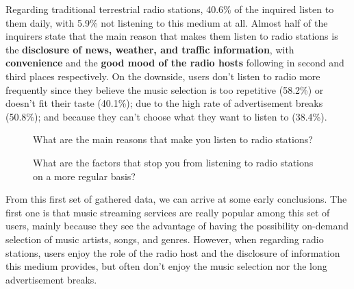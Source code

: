 Regarding traditional terrestrial radio stations, 40.6\% of the inquired listen to them daily, with 5.9\% not listening to this medium at all. Almost half of the inquirers state that the main reason that makes them listen to radio stations is the \textbf{disclosure of news, weather, and traffic information}, with \textbf{convenience} and the \textbf{good mood of the radio hosts} following in second and third places respectively. On the downside, users don't listen to radio more frequently since they believe the music selection is too repetitive (58.2\%) or doesn't fit their taste (40.1\%); due to the high rate of advertisement breaks (50.8\%); and because they can't choose what they want to listen to (38.4\%).

\begin{figure}
	\centering
	\caption{What are the main reasons that make you listen to radio stations?}
	\begin{bchart}[step=10,max=45,unit=\%,width=0.8\textwidth]
            \smallskip
            \smallskip
            \smallskip
            \smallskip
    \end{bchart}
\end{figure}



\begin{figure}
	\centering
	\caption{What are the factors that stop you from listening to radio stations on a more regular basis?}
	\begin{bchart}[step=10,max=70,unit=\%, width=0.8\textwidth]
            \smallskip
            \smallskip
            \smallskip
            \smallskip
    \end{bchart}
\end{figure}


From this first set of gathered data, we can arrive at some early conclusions. The first one is that music streaming services are really popular among this set of users, mainly because they see the advantage of having the possibility on-demand selection of music artists, songs, and genres. However, when regarding radio stations, users enjoy the role of the radio host and the disclosure of information this medium provides, but often don't enjoy the music selection nor the long advertisement breaks.

